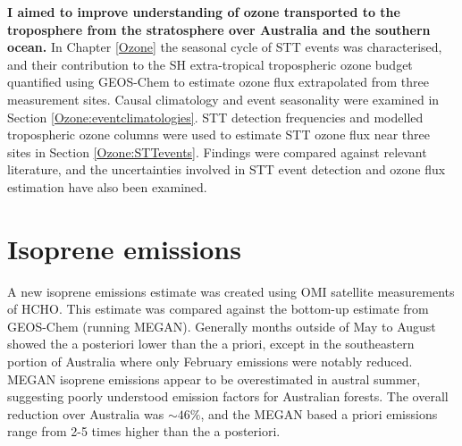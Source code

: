   \textbf{I aimed to improve understanding of ozone transported to the troposphere from the stratosphere over Australia and the southern ocean.}
  In Chapter \ref{Ozone} the seasonal cycle of STT events was characterised, and their contribution to the SH extra-tropical tropospheric ozone budget quantified using GEOS-Chem to estimate ozone flux extrapolated from three measurement sites.
  Causal climatology and event seasonality were examined in Section \ref{Ozone:eventclimatologies}.
  STT detection frequencies and modelled tropospheric ozone columns were used to estimate STT ozone flux near three sites in Section \ref{Ozone:STTevents}. 
  Findings were compared against relevant literature, and %
  the uncertainties involved in STT event detection and ozone flux estimation have also been examined.
  


\section{Isoprene emissions}
\label{Conclusions:isoprene}

  A new isoprene emissions estimate was created using OMI satellite measurements of HCHO.
  This estimate was compared against the bottom-up estimate from GEOS-Chem (running MEGAN).
  Generally months outside of May to August showed the a posteriori lower than the a priori, except in the southeastern portion of Australia where only February emissions were notably reduced.
  MEGAN isoprene emissions appear to be overestimated in austral summer, suggesting poorly understood emission factors for Australian forests.
  The overall reduction over Australia was $\sim{46}\%$, and the MEGAN based a priori emissions range from 2-5 times higher than the a posteriori.
  
